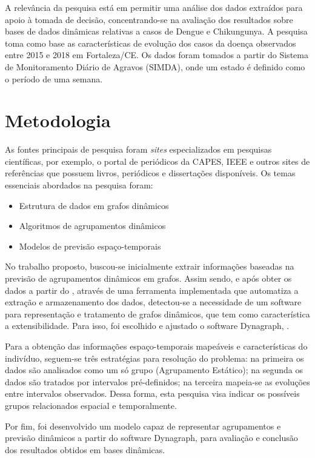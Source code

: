 A relevância da pesquisa está em permitir uma análise dos dados extraídos 
para apoio à tomada de decisão,  concentrando-se na avaliação dos resultados sobre bases de dados
dinâmicas relativas a casos de Dengue e Chikungunya.
A pesquisa toma como base as características de evolução dos casos da doença
observados entre 2015 e 2018 em Fortaleza/CE.
Os dados foram tomados a partir do Sistema de Monitoramento Diário de Agravos (SIMDA), onde um estado é definido como o período de uma semana. 

\section{Metodologia}

As fontes principais de pesquisa foram \textit{sites} especializados em pesquisas científicas, por exemplo, o portal de periódicos
da CAPES, IEEE e outros sites de referências que possuem livros, periódicos e dissertações disponíveis.
Os temas essenciais abordados na pesquisa foram:
\begin{itemize}
	\item Estrutura de dados em grafos dinâmicos
	\item Algoritmos de agrupamentos dinâmicos
	\item Modelos de previsão espaço-temporais
\end{itemize}

No trabalho proposto, buscou-se inicialmente extrair informações baseadas na previsão de agrupamentos dinâmicos
em grafos. Assim sendo, e após obter os dados a partir do \cite{simda}, através de uma ferramenta implementada que automatiza a extração e armazenamento dos dados, detectou-se a necessidade de um software para representação e tratamento de grafos dinâmicos, que tem como característica a extensibilidade. Para isso, foi escolhido e ajustado o software Dynagraph, \cite{dynagraph}.

Para a obtenção das informações espaço-temporais mapeáveis e características do indivíduo, seguem-se três estratégias para resolução do problema: na primeira os dados são analisados como um só grupo (Agrupamento Estático); na segunda os dados são tratados por intervalos pré-definidos; na terceira mapeia-se as evoluções entre intervalos observados.
Dessa forma, esta pesquisa visa indicar os possíveis grupos relacionados espacial e temporalmente.

Por fim, foi desenvolvido um modelo capaz de representar agrupamentos e previsão dinâmicos a partir do software Dynagraph, para avaliação e conclusão dos resultados obtidos em bases dinâmicas.


